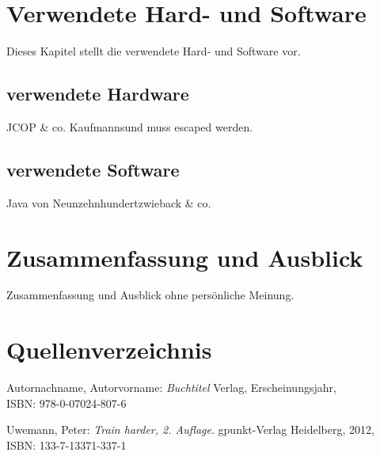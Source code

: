 \documentclass[a4paper,12pt]{scrartcl}
\begin{document}
\clearpage
\section{Verwendete Hard- und Software}
\label{sec:2}
Dieses Kapitel stellt die verwendete Hard- und Software vor.

\subsection{verwendete Hardware}
\label{subsec:2.1}
JCOP \& co. Kaufmannsund muss escaped werden.

\subsection{verwendete Software}
\label{subsec:2.2}
Java von Neunzehnhundertzwieback \& co.


\section{Zusammenfassung und Ausblick}
\label{sec:5}
Zusammenfassung und Ausblick ohne persönliche Meinung.

\clearpage
\section{Quellenverzeichnis}
\label{sec:6}
\renewcommand\refname{Quellenverzeichnis}
\begin{thebibliography}{999}

Autornachname, Autorvorname:  {\sl Buchtitel} Verlag, Erscheinungsjahr,
\\ISBN:  978-0-07024-807-6

Uwemann, Peter:  {\sl Train harder, 2. Auflage}. gpunkt-Verlag Heidelberg, 2012,
\\ISBN: 133-7-13371-337-1


\end{thebibliography}
\end{document}
